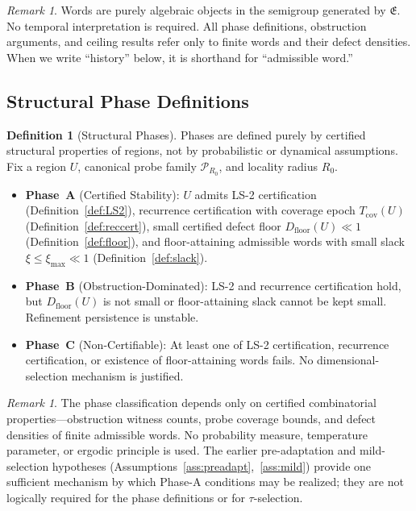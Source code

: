 \documentclass[11pt,a4paper]{article}
\theoremstyle{definition}
\newtheorem{definition}[theorem]{Definition}
\theoremstyle{remark}
\newtheorem{remark}[theorem]{Remark}
\begin{document}
\begin{remark}
Words are purely algebraic objects in the semigroup generated by $\mathfrak{E}$. No temporal interpretation is required. All phase definitions, obstruction arguments, and ceiling results refer only to finite words and their defect densities. When we write ``history'' below, it is shorthand for ``admissible word.''
\end{remark}

\subsection{Structural Phase Definitions}

\begin{definition}[Structural Phases]\label{def:phases}
Phases are defined purely by certified structural properties of regions, not by probabilistic or dynamical assumptions. Fix a region $U$, canonical probe family $\mathcal{P}_{R_0}$, and locality radius $R_0$.
\begin{itemize}[nosep]
  \item \textbf{Phase~A} (Certified Stability): $U$ admits LS-2 certification (Definition~\ref{def:LS2}), recurrence certification with coverage epoch $T_{\mathrm{cov}}(U)$ (Definition~\ref{def:reccert}), small certified defect floor $D_{\mathrm{floor}}(U) \ll 1$ (Definition~\ref{def:floor}), and floor-attaining admissible words with small slack $\xi \leq \xi_{\max} \ll 1$ (Definition~\ref{def:slack}).
  \item \textbf{Phase~B} (Obstruction-Dominated): LS-2 and recurrence certification hold, but $D_{\mathrm{floor}}(U)$ is not small or floor-attaining slack cannot be kept small. Refinement persistence is unstable.
  \item \textbf{Phase~C} (Non-Certifiable): At least one of LS-2 certification, recurrence certification, or existence of floor-attaining words fails. No dimensional-selection mechanism is justified.
\end{itemize}
\end{definition}

\begin{remark}
The phase classification depends only on certified combinatorial properties---obstruction witness counts, probe coverage bounds, and defect densities of finite admissible words. No probability measure, temperature parameter, or ergodic principle is used. The earlier pre-adaptation and mild-selection hypotheses (Assumptions~\ref{ass:preadapt},~\ref{ass:mild}) provide one sufficient mechanism by which Phase-A conditions may be realized; they are not logically required for the phase definitions or for $\tau$-selection.
\end{remark}
\end{document}
